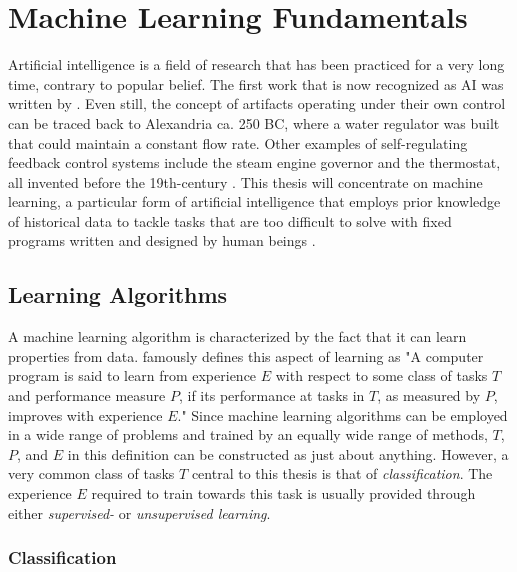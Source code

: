 \section{Machine Learning Fundamentals} \label{sec:bt/MLF}

Artificial intelligence is a field of research that has been practiced for a very long time, contrary to popular belief. The first work that is now recognized as AI was written by \textcite{mcculloch1943}. Even still, the concept of artifacts operating under their own control can be traced back to Alexandria ca. 250 BC, where a water regulator was built that could maintain a constant flow rate. Other examples of self-regulating feedback control systems include the steam engine governor and the thermostat, all invented before the 19th-century \cite{russell2009}. This thesis will concentrate on machine learning, a particular form of artificial intelligence that employs prior knowledge of historical data to tackle tasks that are too difficult to solve with fixed programs written and designed by human beings \cite{goodfellow2016}.

\subsection{Learning Algorithms}

A machine learning algorithm is characterized by the fact that it can learn properties from data. \textcite{mitchell1997} famously defines this aspect of learning as "A computer program is said to learn from experience $E$ with respect to some class of tasks $T$ and performance measure $P$, if its performance at tasks in $T$, as measured by $P$, improves with experience $E$." Since machine learning algorithms can be employed in a wide range of problems and trained by an equally wide range of methods, $T$, $P$, and $E$ in this definition can be constructed as just about anything. However, a very common class of tasks $T$ central to this thesis is that of \textit{classification}. The experience $E$ required to train towards this task is usually provided through either \textit{supervised-} or \textit{unsupervised learning}. 

\subsubsection{Classification}

